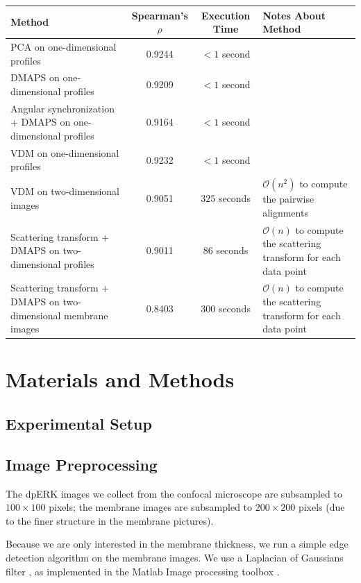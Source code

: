 \documentclass[10pt]{article}
\begin{document}
\begin{table}
	\begin{tabular}{| p{} | c | c | p{} |}
		\hline 
		Method & Spearman's $\rho$ & Execution Time & Notes About Method \\ 
		\hline 
		PCA on one-dimensional profiles & 0.9244 & $< 1$ second & \\
		\hline 
		DMAPS on one-dimensional profiles & 0.9209 & $< 1$ second & \\
		\hline 
		Angular synchronization + DMAPS on one-dimensional profiles & 0.9164 & $< 1$ second & \\
		\hline 
		VDM on one-dimensional profiles & 0.9232 & $< 1$ second & \\	
		\hline 
		VDM on two-dimensional images & 0.9051  & $325$ seconds & $\mathcal{O}(n^2)$ to compute the pairwise alignments\\
		\hline 	
		Scattering transform + DMAPS on two-dimensional profiles & 0.9011  & $86$ seconds &  $\mathcal{O}(n)$ to compute the scattering transform for each data point \\
		\hline
		Scattering transform + DMAPS on two-dimensional membrane images & 0.8403  & $300$ seconds &  $\mathcal{O}(n)$ to compute the scattering transform for each data point \\
		\hline
	\end{tabular}
\end{table}
\section*{Materials and Methods}

\subsection*{Experimental Setup}

\subsection*{Image Preprocessing}
The dpERK images we collect from the confocal microscope are subsampled to $100 \times 100$ pixels; the membrane images are subsampled to $200 \times 200$ pixels (due to the finer structure in the membrane pictures). 

Because we are only interested in the membrane thickness, we run a simple edge detection algorithm on the membrane images.
%
We use a Laplacian of Gaussians filter \cite{...}, as implemented in the Matlab Image processing toolbox \cite{...}.
\end{document}
